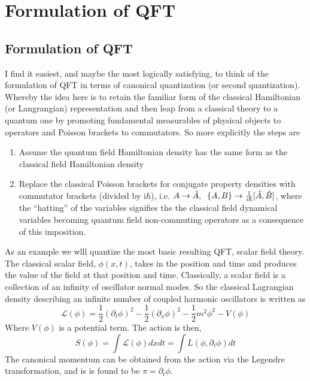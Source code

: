 
\chapter[Formulation of QFT][Formulation of QFT]{Formulation of QFT}
\section{Formulation of QFT}\label{app:qft}
I find it easiest, and maybe the most logically satisfying, to think of the formulation of QFT in terms of canonical quantization (or second quantization). 
Whereby the idea here is to retain the familiar form of the classical Hamiltonian (or Langrangian) representation and then leap from a classical theory to a quantum one by promoting fundamental measurables of physical objects to operators and Poisson brackets to commutators.
So more explicitly the steps are 
\begin{enumerate}
    \item Assume the quantum field Hamiltonian density has the same form as the classical field Hamiltonian density
    \item Replace the classical Poisson brackets for conjugate property densities with commutator brackets (divided by i$\hbar$), i.e.
    $A\rightarrow \hat{A}, \hspace{0.2cm} \{A,B\} \rightarrow\frac{1}{i\hbar}[\hat{A},\hat{B}]$, where the ``hatting'' of the variables signifies the the classical field dynamical variables becoming quantum field non-commuting operators as a consequence of this imposition.
\end{enumerate}
As an example we wlll quantize the most basic resulting QFT, scalar field theory. 
The classical scalar field, $\phi(x,t)$, takes in the position and time and produces the value of the field at that position and time.
Classically, a scalar field is a collection of an infinity of oscillator normal modes.
So the classical Lagrangian density describing an infinite number of coupled harmonic oscillators is written as
\begin{equation}
    \mathcal{L}(\phi)= \frac{1}{2}(\partial_{t}\phi)^2 - \frac{1}{2}(\partial_{x}\phi)^2 - \frac{1}{2}m^{2}\phi^{2} - V(\phi)
\end{equation}
Where $V(\phi)$ is a potential term.
The action is then,
\begin{equation*}
    S(\phi)= \int \mathcal{L}(\phi)dxdt = \int L(\phi, \partial_{t}\phi)dt
\end{equation*}
The canonical momentum can be obtained from the action via the Legendre transformation, and is is found to be  $\displaystyle \pi =\partial _{t}\phi$.
